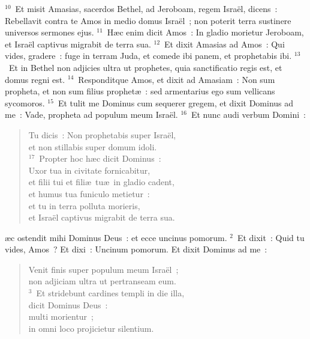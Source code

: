 ${}^{10}$~Et misit Amasias, sacerdos Bethel, ad Jeroboam, regem Isra\"el, dicens~: Rebellavit contra te Amos in medio domus Isra\"el~; non poterit terra sustinere universos sermones ejus.
${}^{11}$~H\ae c enim dicit Amos~: In gladio morietur Jeroboam, et Isra\"el captivus migrabit de terra sua.
${}^{12}$~Et dixit Amasias ad Amos~: Qui vides, gradere~: fuge in terram Juda, et comede ibi panem, et prophetabis ibi.
${}^{13}$~Et in Bethel non adjicies ultra ut prophetes, quia sanctificatio regis est, et domus regni est.
${}^{14}$~Responditque Amos, et dixit ad Amasiam~: Non sum propheta, et non sum filius prophet\ae~: sed armentarius ego sum vellicans sycomoros.
${}^{15}$~Et tulit me Dominus cum sequerer gregem, et dixit Dominus ad me~: Vade, propheta ad populum meum Isra\"el.
${}^{16}$~Et nunc audi verbum Domini~: \begin{flushleft}\begin{verse}Tu dicis~: Non prophetabis super Isra\"el,\\ et non stillabis super domum idoli.\\
${}^{17}$~Propter hoc h\ae c dicit Dominus~:\\ Uxor tua in civitate fornicabitur,\\ et filii tui et fili\ae\ tu\ae\ in gladio cadent,\\ et humus tua funiculo metietur~:\\ et tu in terra polluta morieris,\\ et Isra\"el captivus migrabit de terra sua.\end{verse}\end{flushleft}



\bchapter
{}\ae c ostendit mihi Dominus Deus~: et ecce uncinus pomorum.
${}^{2}$~Et dixit~: Quid tu vides, Amos~? Et dixi~: Uncinum pomorum. Et dixit Dominus ad me~: \begin{flushleft}\begin{verse}Venit finis super populum meum Isra\"el~;\\ non adjiciam ultra ut pertranseam eum.\\
${}^{3}$~Et stridebunt cardines templi in die illa,\\ dicit Dominus Deus~:\\ multi morientur~;\\ in omni loco projicietur silentium.\end{verse}\end{flushleft}


